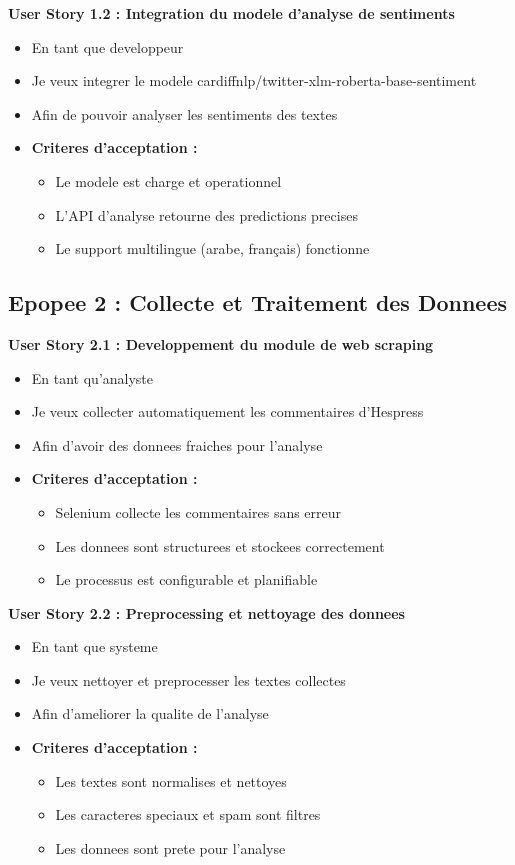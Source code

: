 \textbf{User Story 1.2 : Integration du modele d'analyse de sentiments}
\begin{itemize}
    \item En tant que developpeur
    \item Je veux integrer le modele cardiffnlp/twitter-xlm-roberta-base-sentiment
    \item Afin de pouvoir analyser les sentiments des textes
    \item \textbf{Criteres d'acceptation :}
    \begin{itemize}
        \item Le modele est charge et operationnel
        \item L'API d'analyse retourne des predictions precises
        \item Le support multilingue (arabe, français) fonctionne
    \end{itemize}
\end{itemize}

\subsection{Epopee 2 : Collecte et Traitement des Donnees}

\textbf{User Story 2.1 : Developpement du module de web scraping}
\begin{itemize}
    \item En tant qu'analyste
    \item Je veux collecter automatiquement les commentaires d'Hespress
    \item Afin d'avoir des donnees fraiches pour l'analyse
    \item \textbf{Criteres d'acceptation :}
    \begin{itemize}
        \item Selenium collecte les commentaires sans erreur
        \item Les donnees sont structurees et stockees correctement
        \item Le processus est configurable et planifiable
    \end{itemize}
\end{itemize}

\textbf{User Story 2.2 : Preprocessing et nettoyage des donnees}
\begin{itemize}
    \item En tant que systeme
    \item Je veux nettoyer et preprocesser les textes collectes
    \item Afin d'ameliorer la qualite de l'analyse
    \item \textbf{Criteres d'acceptation :}
    \begin{itemize}
        \item Les textes sont normalises et nettoyes
        \item Les caracteres speciaux et spam sont filtres
        \item Les donnees sont prete pour l'analyse
    \end{itemize}
\end{itemize}

